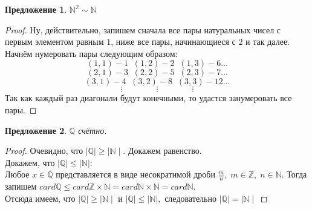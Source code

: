 \documentclass{article}
\newtheorem{Proposition}{Предложение}[section]
\begin{document}
\begin{Proposition}
$\mathbb{N^2}\sim\mathbb{N}$ 
\end{Proposition}
\begin{proof}
Ну, действительно, запишем сначала все пары натуральных чисел с первым элементом равным $1$, ниже все пары, начинающиеся с $2$ и так далее. Начнём нумеровать пары следующим образом:
$$(1,1) - 1 \;\; (1,2) - 2 \;\; (1,3) - 6 \ldots$$
$$(2,1) - 3 \;\; (2,2) - 5 \;\; (2,3) - 7 \ldots$$
$$(3,1) - 4 \;\; (3,2) - 8 \;\; (3,3) - 12 \ldots$$
$$\vdots \quad\quad\quad\quad\vdots \quad\quad\quad\quad\vdots$$
Так как каждый раз диагонали будут конечными, то удастся занумеровать все пары.
\end{proof}

\begin{Proposition}
$\mathbb{Q}$ счётно.
\end{Proposition}
\begin{proof}
Очевидно, что $\mid\mathbb{Q}\mid \geq\mid\mathbb{N}\mid.$ Докажем равенство.\\
Докажем, что $\mid\mathbb{Q}\mid \leq\mid\mathbb{N}\mid:$ \\
Любое $x\in\mathbb{Q}$ представляется в виде несократимой дроби $\frac{m}{n}, \; m\in\mathbb{Z}, \; n\in\mathbb{N}.$ Тогда запишем $card\mathbb{Q}\leq card\mathbb{Z}\times\mathbb{N} = card\mathbb{N}\times\mathbb{N}=card\mathbb{N}.$\\
Отсюда имеем, что $\mid\mathbb{Q}\mid \geq\mid\mathbb{N}\mid$ и $\mid\mathbb{Q}\mid \leq\mid\mathbb{N}\mid,$ следовательно $\mid\mathbb{Q}\mid =\mid\mathbb{N}\mid$
\end{proof}
\end{document}
